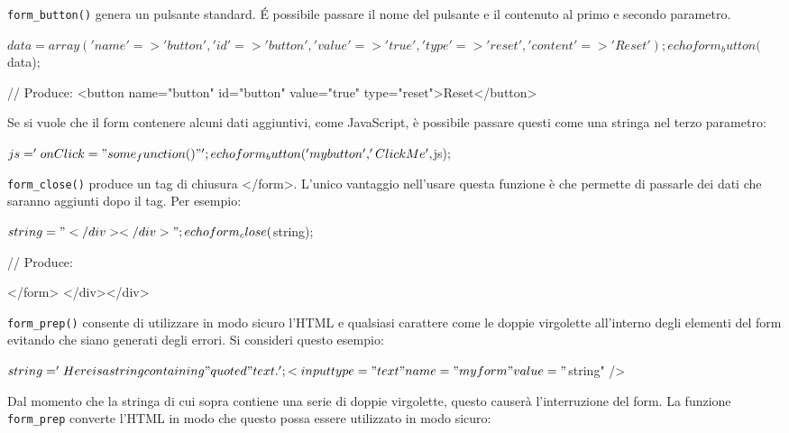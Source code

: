 \verb|form_button()| genera un pulsante standard. \'E possibile passare il nome del pulsante e il contenuto al primo e secondo parametro.

\begin{code}
$data = array(
    'name' => 'button',
    'id' => 'button',
    'value' => 'true',
    'type' => 'reset',
    'content' => 'Reset'
);

echo form_button($data);

// Produce:
<button name="button" id="button" value="true" type="reset">Reset</button>
\end{code}

Se si vuole che il form contenere alcuni dati aggiuntivi, come JavaScript, è possibile passare questi come una stringa nel terzo parametro:

\begin{code}
$js = 'onClick="some_function()"';

echo form_button('mybutton', 'Click Me', $js);
\end{code}

\verb|form_close()| produce un tag di chiusura </form>. L'unico vantaggio nell'usare questa funzione è che permette di passarle dei dati che saranno aggiunti dopo il tag. Per esempio:

\begin{code}
$string = "</div></div>";

echo form_close($string);

// Produce:

</form>
</div></div>
\end{code}

\verb|form_prep()| consente di utilizzare in modo sicuro l'HTML e qualsiasi carattere come le doppie virgolette all'interno degli elementi del form evitando che siano generati degli errori. Si consideri questo esempio:

\begin{code}
$string = 'Here is a string containing "quoted" text.';

<input type="text" name="myform" value="$string" />
\end{code}

Dal momento che la stringa di cui sopra contiene una serie di doppie virgolette, questo causerà l'interruzione del form. La funzione \verb|form_prep| converte l'HTML in modo che questo possa essere utilizzato in modo sicuro:


